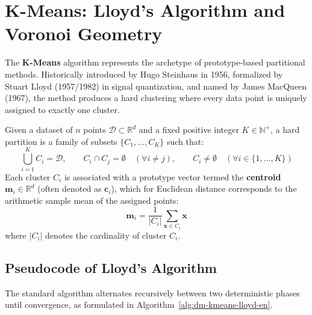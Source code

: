 \section{K-Means: Lloyd's Algorithm and Voronoi Geometry}
\label{sec:dm-kmeans-algorithm-geometry}

The \textbf{K-Means} algorithm represents the archetype of prototype-based partitional methods. Historically introduced by Hugo Steinhaus in 1956, formalized by Stuart Lloyd (1957/1982) in signal quantization, and named by James MacQueen (1967), the method produces a hard clustering where every data point is uniquely assigned to exactly one cluster.

\begin{definition}
Given a dataset of $n$ points $\mathcal{D} \subset \mathbb{R}^d$ and a fixed positive integer $K \in \mathbb{N}^+$, a hard partition is a family of subsets $\{C_1, \dots, C_K\}$ such that:
\begin{equation}
    \bigcup_{i=1}^K C_i = \mathcal{D}, \qquad C_i \cap C_j = \emptyset \quad (\forall i \ne j), \qquad C_i \ne \emptyset \quad (\forall i \in \{1, \dots, K\})
\end{equation}
Each cluster $C_i$ is associated with a prototype vector termed the \textbf{centroid} $\mathbf{m}_i \in \mathbb{R}^d$ (often denoted as $\mathbf{c}_i$), which for Euclidean distance corresponds to the arithmetic sample mean of the assigned points:
\begin{equation}
    \mathbf{m}_i = \frac{1}{|C_i|} \sum_{\mathbf{x} \in C_i} \mathbf{x}
    \label{eq:dm-centroid-definition-en}
\end{equation}
where $|C_i|$ denotes the cardinality of cluster $C_i$.
\end{definition}

\subsection{Pseudocode of Lloyd's Algorithm}

The standard algorithm alternates recursively between two deterministic phases until convergence, as formulated in Algorithm~\ref{alg:dm-kmeans-lloyd-en}.

